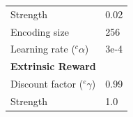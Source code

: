 \documentclass[letterpaper, 10 pt, conference]{ieeeconf}  %
\begin{document}
\begin{table}[t]
\begin{center}
\begin{tabular}{l|l}
				Strength                                  & 0.02                  \\
				Encoding size                             & 256                   \\
				Learning rate ($^{c}\alpha$)              & 3e-4                  \\ \hline
				\multicolumn{2}{l}{\textbf{Extrinsic Reward}}                     \\ \hline
				Discount factor ($^{e}\gamma$)            & 0.99                  \\
				Strength                                  & 1.0                   \\ \hline
			\end{tabular}
		\end{center}
		\label{tab2}
	\end{table}
	
\end{document}
